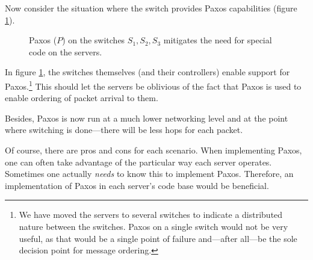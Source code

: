 Now consider the situation where the switch provides Paxos
capabilities (figure \ref{figure:paxos.on.switches}).

\begin{figure}[H]
  \centering
  \caption{Paxos ($P$) on the switches $S_1, S_2, S_3$ mitigates the need for special code on the servers.}
  \label{figure:paxos.on.switches}
\end{figure}

In figure \ref{figure:paxos.on.switches}, the switches themselves (and their
controllers) enable
support for Paxos.\footnote{We have moved the servers to several switches
to indicate a distributed nature between the switches.
Paxos on a single switch would not be very useful, as that would be a single
point of failure and---after all---be the sole decision point for message
ordering.}
This should let the servers be oblivious of the fact that Paxos is used to
enable ordering of packet arrival to them.

Besides, Paxos is now run at a much lower networking level and at the point where switching is done---there will be less hops
for each packet.

Of course, there are pros and cons for each scenario.
When implementing Paxos, one can often take advantage of
the particular way each server operates. Sometimes one actually
\textit{needs} to know this to implement Paxos.  Therefore, an
implementation of Paxos in each server's code base would be beneficial.

